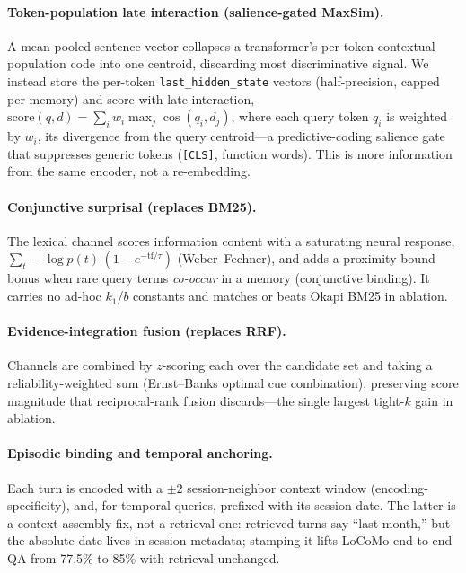 \documentclass[11pt]{article}
\begin{document}
\paragraph{Token-population late interaction (salience-gated MaxSim).} A
mean-pooled sentence vector collapses a transformer's per-token contextual
population code into one centroid, discarding most discriminative signal. We
instead store the per-token \texttt{last\_hidden\_state} vectors (half-precision,
capped per memory) and score with late interaction,
$\mathrm{score}(q,d)=\sum_{i} w_i \max_{j} \cos(q_i, d_j)$, where each query token
$q_i$ is weighted by $w_i$, its divergence from the query centroid---a
predictive-coding salience gate that suppresses generic tokens (\texttt{[CLS]},
function words). This is more information from the same encoder, not a re-embedding.

\paragraph{Conjunctive surprisal (replaces BM25).} The lexical channel scores
information content with a saturating neural response,
$\sum_t {-}\!\log p(t)\,(1-e^{-\mathrm{tf}/\tau})$ (Weber--Fechner), and adds a
proximity-bound bonus when rare query terms \emph{co-occur} in a memory
(conjunctive binding). It carries no ad-hoc $k_1$/$b$ constants and matches or
beats Okapi BM25 in ablation.

\paragraph{Evidence-integration fusion (replaces RRF).} Channels are combined by
$z$-scoring each over the candidate set and taking a reliability-weighted sum
(Ernst--Banks optimal cue combination), preserving score magnitude that
reciprocal-rank fusion discards---the single largest tight-$k$ gain in ablation.

\paragraph{Episodic binding and temporal anchoring.} Each turn is encoded with a
$\pm2$ session-neighbor context window (encoding-specificity), and, for temporal
queries, prefixed with its session date. The latter is a context-assembly fix,
not a retrieval one: retrieved turns say ``last month,'' but the absolute date
lives in session metadata; stamping it lifts LoCoMo end-to-end QA from 77.5\% to
85\% with retrieval unchanged.
\end{document}
